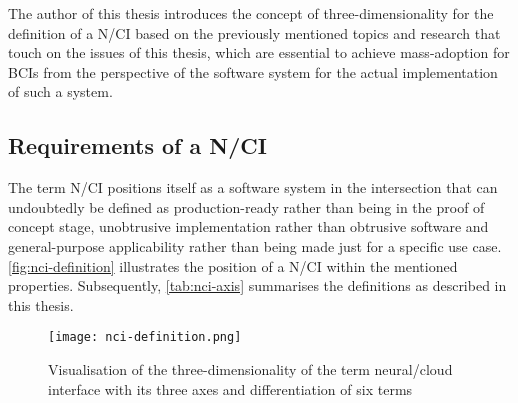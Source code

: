 The author of this thesis introduces the concept of three-dimensionality for the definition of a N/CI based on the previously mentioned topics and research that touch on the issues of this thesis, which are essential to achieve mass-adoption for BCIs from the perspective of the software system for the actual implementation of such a system.

\subsection{Requirements of a N/CI}
\label{chapter2-requirements-of-a-nci}

The term N/CI positions itself as a software system in the intersection that can undoubtedly be defined as production-ready rather than being in the proof of concept stage, unobtrusive implementation rather than obtrusive software and general-purpose applicability rather than being made just for a specific use case. \autoref{fig:nci-definition} illustrates the position of a N/CI within the mentioned properties. Subsequently, \autoref{tab:nci-axis} summarises the definitions as described in this thesis.

\begin{figure}[ht]
  \centering
  \texttt{[image: nci-definition.png]}
  \caption{Visualisation of the three-dimensionality of the term neural/cloud interface with its three axes and differentiation of six terms}
  \label{fig:nci-definition}
\end{figure}


